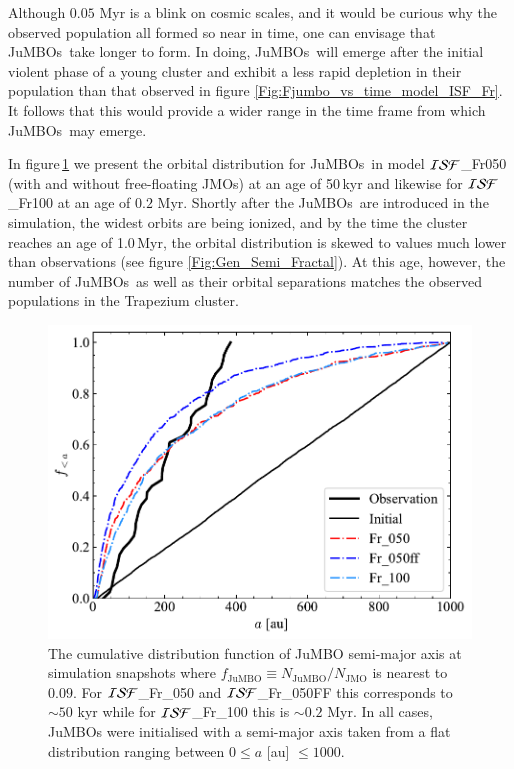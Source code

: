 \documentclass[submission,phys]{lib/SciPost}
\newcommand{\jumbos}{\mbox{JuMBOs}}
\begin{document}
Although $0.05$ Myr is a blink on cosmic 
scales, and it would be curious why the observed population all formed so near 
in time, one can envisage that \jumbos\ take longer to form. In doing, \jumbos\ 
will emerge after the initial violent phase of a young cluster and exhibit a  
less rapid depletion in their population than that observed in figure  
\ref{Fig:Fjumbo_vs_time_model_ISF_Fr}. It follows that this would provide a  
wider range in the time frame from which \jumbos\ may emerge.

In figure\,\ref{Fig:sma_vs_time_model_ISF_FrA} we present the orbital
distribution for \jumbos\, in model ${\cal ISF}$\_Fr050 (with and
without free-floating JMOs) at an age of 50\,kyr and likewise for ${\cal ISF}$\_Fr100 at an age of $0.2$ Myr. Shortly after the
\jumbos\, are introduced in the simulation, the widest orbits are
being ionized, and by the time the cluster reaches an age of 1.0\,Myr,
the orbital distribution is skewed to values much lower than observations (see figure \ref{Fig:Gen_Semi_Fractal}). At this age, however, the number of \jumbos\, as
well as their orbital separations matches the observed populations in
the Trapezium cluster. 

\begin{figure}
    \centering
    \includegraphics[width=\columnwidth]{figures/Fractal_General_sem_axis_crop.pdf}
    \caption{
    The cumulative distribution function of JuMBO semi-major axis at simulation 
    snapshots where $f_{\mathrm{JuMBO}}\equiv{N_{\mathrm{JuMBO}}}/{N_{\mathrm{JMO}}}$ is 
    nearest to $0.09$. For ${\cal ISF}$\_Fr\_050 and ${\cal ISF}$\_Fr\_050FF this corresponds to $\sim 50$ kyr 
    while for ${\cal ISF}$\_Fr\_100 this is $\sim0.2$ Myr. In all cases, JuMBOs were initialised 
    with a semi-major axis taken from a flat distribution ranging between 
    $0\leq a$ [au] $\leq 1000$.
    }
        \label{Fig:sma_vs_time_model_ISF_FrA}
\end{figure}
\end{document}
